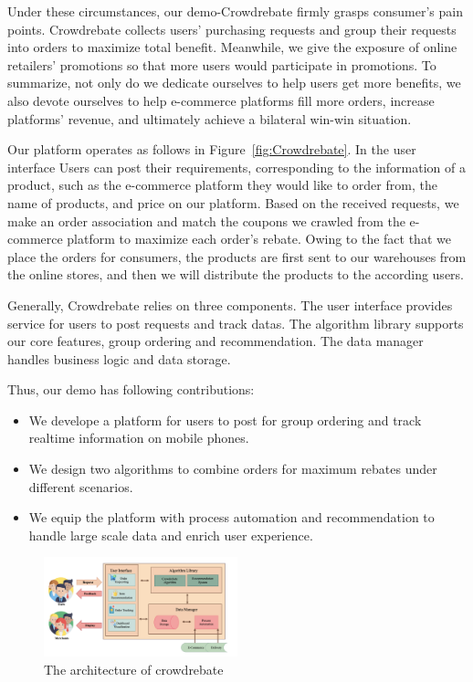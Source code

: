 Under these circumstances, our demo-Crowdrebate firmly grasps consumer's pain points. Crowdrebate collects users’
purchasing requests and group their requests into orders to
maximize total benefit. Meanwhile, we give the exposure of online retailers' promotions so that more users would participate in promotions. To summarize, not only do we dedicate ourselves to help users get more benefits, we also devote ourselves to help e-commerce platforms fill more orders, increase platforms’ revenue, and ultimately achieve a bilateral win-win situation.

Our platform operates as follows in Figure~\ref{fig:Crowdrebate}. In the user interface Users can post their requirements, corresponding to the information of a product, such as the e-commerce platform they would like to order from, the name of products, and price on our platform. Based on the received requests, we make an order association and match the coupons we crawled from the e-commerce platform to maximize each order's rebate. Owing to the fact that we place the orders for consumers, the products are first sent to our warehouses from the online stores, and then we will distribute the products to the according users.

Generally, Crowdrebate relies on three components. The user interface provides service for users to post requests and track datas. The algorithm library supports our core features, group ordering and recommendation. The data manager handles business logic and data storage.

Thus, our demo has following contributions:
\begin{itemize}
	\item We develope a platform for users to post for group ordering and track realtime information on mobile phones.
	\item We design two algorithms to combine orders for maximum rebates under different scenarios.
	\item We equip the platform with process automation and recommendation to handle large scale data and enrich user experience.
\end{itemize}
\begin{figure}[t] 
	\centering %
	\includegraphics[width=0.5\textwidth]{../figure/ar.png} %
	\caption{The architecture of crowdrebate} %
	\label{fig:ar} %
\end{figure}

